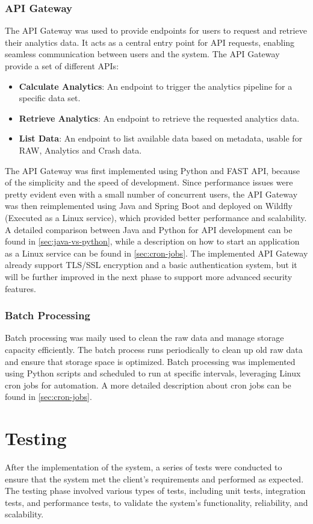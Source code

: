 \subsubsection{API Gateway}
The API Gateway was used to provide endpoints for users to request and retrieve their analytics data. It acts as a central entry point for API requests, enabling seamless communication between users and the system.
The API Gateway provide a set of different APIs:
\begin{itemize}
    \item \textbf{Calculate Analytics}: An endpoint to trigger the analytics pipeline for a specific data set.
    \item \textbf{Retrieve Analytics}: An endpoint to retrieve the requested analytics data.
    \item \textbf{List Data}: An endpoint to list available data based on metadata, usable for RAW, Analytics and Crash data.
\end{itemize}

The API Gateway was first implemented using Python and FAST API, because of the simplicity and the speed of development.
Since performance issues were pretty evident even with a small number of concurrent users, the API Gateway was then reimplemented using Java and Spring Boot and deployed on Wildfly (Executed as a Linux service), which provided better performance and scalability. A detailed comparison between Java and Python for API development can be found in \ref{sec:java-vs-python}, while a description on how to start an application as a Linux service can be found in \ref{sec:cron-jobs}.
The implemented API Gateway already support TLS/SSL encryption and a basic authentication system, but it will be further improved in the next phase to support more advanced security features.

\subsubsection{Batch Processing}
Batch processing was maily used to clean the raw data and manage storage capacity efficiently. The batch process runs periodically to clean up old raw data and ensure that storage space is optimized. Batch processing was implemented using Python scripts and scheduled to run at specific intervals, leveraging Linux cron jobs for automation. A more detailed description about cron jobs can be found in \ref{sec:cron-jobs}.

\section{Testing}
\label{sec:testing}
After the implementation of the system, a series of tests were conducted to ensure that the system met the client's requirements and performed as expected. The testing phase involved various types of tests, including unit tests, integration tests, and performance tests, to validate the system's functionality, reliability, and scalability.

